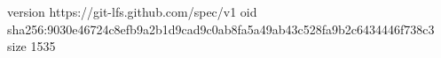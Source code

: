version https://git-lfs.github.com/spec/v1
oid sha256:9030e46724c8efb9a2b1d9cad9c0ab8fa5a49ab43c528fa9b2c6434446f738c3
size 1535
